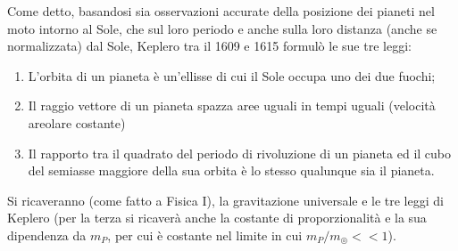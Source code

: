 \documentclass[a4paper, oneside]{book}
\begin{document}
\noindent 
Come detto, basandosi sia osservazioni accurate della posizione dei pianeti nel moto intorno al Sole, che 
sul loro periodo e anche sulla loro distanza (anche se normalizzata) dal Sole, Keplero tra il 1609 e 1615 formulò le sue tre leggi:
\begin{enumerate}
    \item L'orbita di un pianeta è un'ellisse di cui il Sole occupa uno dei due fuochi;
    \item Il raggio vettore di un pianeta spazza aree uguali in tempi uguali (velocità areolare costante)
    \item Il rapporto tra il quadrato del periodo di rivoluzione di un pianeta 
    ed il cubo del semiasse maggiore della sua orbita è lo stesso qualunque sia il pianeta.
\end{enumerate}
Si ricaveranno (come fatto a Fisica I), la gravitazione universale e le tre leggi di Keplero 
(per la terza si ricaverà anche la costante di proporzionalità e la sua dipendenza da 
$m_P$, per cui è costante nel limite in cui $m_P/m_\circledcirc << 1$).

\clearpage
\end{document}
